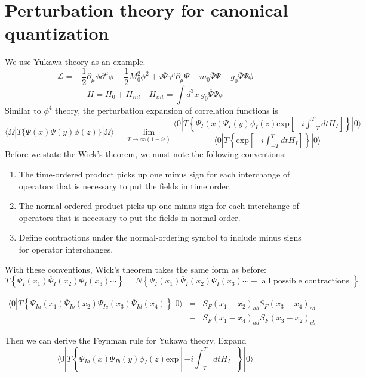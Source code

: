\section{Perturbation theory for canonical quantization}
\noindent
We use Yukawa theory as an example.
\[\mathcal{L} = -\frac{1}{2}\partial_{\mu} \phi \partial^{\mu} \phi -\frac{1}{2}M_0^2 \phi^2 + i\overline{\Psi} \gamma^{\mu} \partial_{\mu} \Psi - m_0\overline{\Psi}\Psi -g_0 \overline{\Psi}\Psi\phi\]
\[H = H_0 + H_{int} \quad H_{int} = \int d^3 x \: g_0 \overline{\Psi}\Psi\phi \]
Similar to $\phi^4$ theory, the perturbation expansion of correlation functions is
\[\langle \Omega | T \{\Psi(x) \overline{\Psi}(y) \phi(z) \} | \Omega \rangle = \lim_{T \to \infty(1-i\epsilon)} \frac{\langle 0 | T \left\{ \Psi_I(x) \overline{\Psi}_I(y) \phi_I(z) \mathrm{exp} \left[ -i \int_{-T}^{T} dt H_I \right]\right\} | 0 \rangle}{\langle 0 | T \left\{ \mathrm{exp} \left[ -i \int_{-T}^{T} dt H_I \right]\right\} | 0 \rangle}\]
Before we state the Wick's theorem, we must note the following conventions:
\begin{enumerate}
\item  The time-ordered product picks up one minus sign for each
interchange of operators that is necessary to put the fields in time order.
\item The normal-ordered product picks up one minus sign for each
interchange of operators that is necessary to put the fields in normal order.
\item Define contractions under the normal-ordering symbol to include minus signs for operator interchanges.
\end{enumerate}
With these conventions, Wick's theorem takes the same form as before:
\[T \left\{ \Psi_I(x_1) \overline{\Psi}_I(x_2)  \Psi_I(x_3) \cdots \right\} = N \left\{\Psi_I(x_1) \overline{\Psi}_I(x_2)  \Psi_I(x_3) \cdots + \mbox{ all possible contractions }\right\} \]
\begin{example}
\begin{eqnarray}
\langle 0 | T \left\{ \Psi_{Ia}(x_1) \overline{\Psi}_{Ib}(x_2) \Psi_{Ic}(x_3) \overline{\Psi}_{Id}(x_4)\right\}| 0 \rangle &=& S_F(x_1-x_2)_{ab}S_F(x_3-x_4)_{cd} \nonumber \\
&-& S_F(x_1-x_4)_{ad}S_F(x_3-x_2)_{cb} \nonumber
\end{eqnarray}
\end{example}
Then we can derive the Feynman rule for Yukawa theory. 
Expand
\[\langle 0 | T \left\{ \Psi_{Ia}(x) \overline{\Psi}_{Ib}(y) \phi_I(z) \mathrm{exp} \left[ -i \int_{-T}^{T} dt H_I \right]\right\} | 0 \rangle\] 

